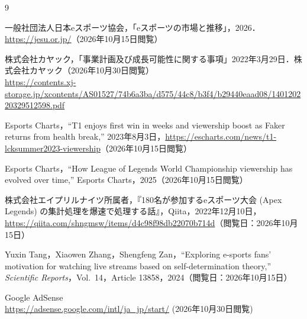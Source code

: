 \begin{thebibliography}{9}

一般社団法人日本eスポーツ協会，「eスポーツの市場と推移」，2026．\\
\url{https://jesu.or.jp/}（2026年10月15日閲覧）

株式会社カヤック，「事業計画及び成長可能性に関する事項」2022年3月29日．株式会社カヤック（2026年10月30日閲覧）\\
\url{https://contents.xj-storage.jp/xcontents/AS01527/74b6a3ba/d575/44c8/b3f4/b29440eaad08/140120220329512598.pdf}

Esports Charts，``T1 enjoys first win in weeks and viewership boost as Faker returns from health break,'' 2023年8月3日，\url{https://escharts.com/news/t1-lcksummer2023-viewership}（2026年10月15日閲覧）

Esports Charts，``How League of Legends World Championship viewership has evolved over time,'' Esports Charts，2025（2026年10月15日閲覧）

株式会社エイプリルナイツ所属者，『180名が参加するeスポーツ大会 (Apex Legends) の集計処理を爆速で処理する話』，Qiita，2022年12月10日，\url{https://qiita.com/shngmsw/items/d4c98f98db22070b714d}（閲覧日：2026年10月15日）

Yuxin Tang，Xiaowen Zhang，Shengfeng Zan，``Exploring e-sports fans' motivation for watching live streams based on self-determination theory,'' \textit{Scientific Reports}，Vol.~14，Article 13858，2024（閲覧日：2026年10月15日）

Google AdSense\\
\url{https://adsense.google.com/intl/ja_jp/start/} (2026年10月30日閲覧)

\end{thebibliography}